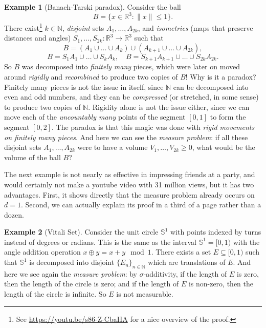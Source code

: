 \documentclass[
]{book}
\newcommand{\N}{\mathbb{N}}
\newcommand{\R}{\mathbb{R}}
\newcommand{\SSS}{\mathbb{S}}
\renewcommand*{\leq}{\leqslant}
\renewcommand*{\geq}{\geqslant}
\theoremstyle{definition}
\theoremstyle{definition}
\newtheorem{example}{Example}[chapter]
\theoremstyle{definition}
\theoremstyle{definition}
\theoremstyle{remark}
\begin{document}
\begin{example}[Banach-Tarski paradox]
\protect\hypertarget{exm:banachtarski}{}\label{exm:banachtarski}Consider the ball \[B = \{x \in \R^3 : \|x\| \leq 1 \} .\] There exist\footnote{See \url{https://youtu.be/s86-Z-CbaHA} for a nice overview of the
  proof.}
\(k\in\N\), \emph{disjoint} sets \(A_1,\dots,A_{2k}\), and \emph{isometries} (maps
that preserve distances and angles) \(S_1,\dots,S_{2k}:\R^3\to\R^3\) such
that
\[B = (A_1 \cup \dots \cup A_k) \cup (A_{k+1} \cup \dots \cup A_{2k}),\]
\[B = S_1 A_1 \cup \dots \cup S_{k} A_{k}, \quad B = S_{k+1} A_{k+1} \cup \dots \cup S_{2k} A_{2k}.\]
So \(B\) was decomposed into \emph{finitely many} pieces, which were later on
moved around \emph{rigidly} and \emph{recombined} to produce two copies of \(B\)!
Why is it a paradox? Finitely many pieces is not the issue in itself,
since \(\N\) can be decomposed into even and odd numbers, and they can be
\emph{compressed} (or stretched, in some sense) to produce two copies of
\(\N\). Rigidity alone is not the issue either, since we can move each of
the \emph{uncountably many} points of the segment \([0,1]\) to form the segment
\([0,2]\). The paradox is that this magic was done with \emph{rigid movements
on finitely many pieces}. And here we can see the \emph{measure problem}: if
all these disjoint sets \(A_1,\dots,A_{2k}\) were to have a volume
\(V_1,\dots,V_{2k} \geq 0\), what would be the volume of the ball \(B\)?
\end{example}

The next example is not nearly as effective in impressing friends at a
party, and would certainly not make a youtube video with 31 million
views, but it has two advantages. First, it shows directly that the
measure problem already occurs on \(d=1\). Second, we can actually explain
its proof in a third of a page rather than a dozen.

\begin{example}[Vitali Set]
\protect\hypertarget{exm:vitali}{}\label{exm:vitali}Consider the unit circle \(\SSS^1\) with points indexed by turns instead of degrees or radians.
This is the same as the interval \(\SSS^1 = [0,1)\) with the angle
addition operation \(x \oplus y = x+y \mod 1\). There exists a set
\(E \subseteq [0,1)\) such that \(\SSS^1\) is decomposed into disjoint
\(\{E_n\}_{n\in\N}\) which are translations of \(E\). And here we see again
the \emph{measure problem}: by \(\sigma\)-additivity, if the length of \(E\) is
zero, then the length of the circle is zero; and if the length of \(E\) is
non-zero, then the length of the circle is infinite. So \(E\) is not
measurable.
\end{example}
\end{document}
